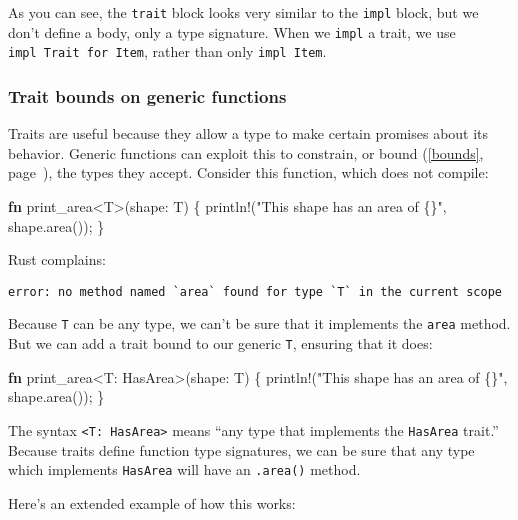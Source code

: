 \documentclass[a4paper,]{book}
\renewcommand*{\hyperref}[2][\ar]{%
  \def\ar{#2}%
  #2 (\autoref{#1}, page~\pageref{#1})}
\newenvironment{Shaded}{\begin{snugshade}}{\end{snugshade}}
\newcommand{\KeywordTok}[1]{\textcolor[rgb]{0.13,0.29,0.53}{\textbf{{#1}}}}
\newcommand{\StringTok}[1]{\textcolor[rgb]{0.31,0.60,0.02}{{#1}}}
\newcommand{\OtherTok}[1]{\textcolor[rgb]{0.56,0.35,0.01}{{#1}}}
\newcommand{\NormalTok}[1]{{#1}}
\begin{document}
As you can see, the \texttt{trait} block looks very similar to the
\texttt{impl} block, but we don't define a body, only a type signature.
When we \texttt{impl} a trait, we use \texttt{impl\ Trait\ for\ Item},
rather than only \texttt{impl\ Item}.

\subsubsection{Trait bounds on generic
functions}\label{trait-bounds-on-generic-functions}

Traits are useful because they allow a type to make certain promises
about its behavior. Generic functions can exploit this to constrain, or
\hyperref[bounds]{bound}, the types they accept. Consider this function,
which does not compile:

\begin{Shaded}
\begin{Highlighting}[]
\KeywordTok{fn} \NormalTok{print_area<T>(shape: T) \{}
    \OtherTok{println!}\NormalTok{(}\StringTok{"This shape has an area of \{\}"}\NormalTok{, shape.area());}
\NormalTok{\}}
\end{Highlighting}
\end{Shaded}

Rust complains:

\begin{verbatim}
error: no method named `area` found for type `T` in the current scope
\end{verbatim}

Because \texttt{T} can be any type, we can't be sure that it implements
the \texttt{area} method. But we can add a trait bound to our generic
\texttt{T}, ensuring that it does:

\begin{Shaded}
\begin{Highlighting}[]
\KeywordTok{fn} \NormalTok{print_area<T: HasArea>(shape: T) \{}
    \OtherTok{println!}\NormalTok{(}\StringTok{"This shape has an area of \{\}"}\NormalTok{, shape.area());}
\NormalTok{\}}
\end{Highlighting}
\end{Shaded}

The syntax \texttt{\textless{}T:\ HasArea\textgreater{}} means ``any
type that implements the \texttt{HasArea} trait.'' Because traits define
function type signatures, we can be sure that any type which implements
\texttt{HasArea} will have an \texttt{.area()} method.

Here's an extended example of how this works:
\end{document}
